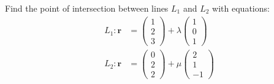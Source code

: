 \documentclass[
	11pt, %
	fleqn, %
	a4paper, %
]{../../styles/LegrandOrangeBook}
\begin{document}
\newpage
\begin{worked}
	Find the point of intersection between lines $L_1$ and $L_2$ with equations:
	\begin{align*}
		L_1: \mathbf{r} &= \begin{pmatrix}
			1 \\ 2 \\ 3
		\end{pmatrix} + \lambda \begin{pmatrix}
			1 \\ 0 \\ 1
		\end{pmatrix} \\
		L_2: \mathbf{r} &= \begin{pmatrix}
			0 \\ 2 \\ 2
		\end{pmatrix} + \mu \begin{pmatrix}
			2 \\ 1 \\ -1
		\end{pmatrix} 
	\end{align*}
\end{worked}
\end{document}
